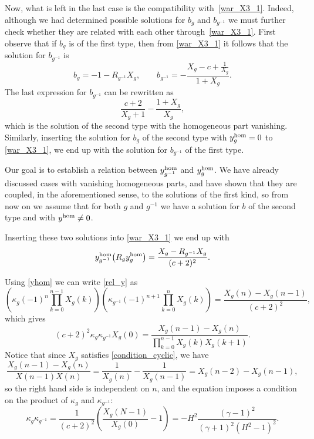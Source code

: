 \documentclass[10pt,a4paper]{amsart}
\numberwithin{equation}{section}
\begin{document}
Now, what is left in the last case is the compatibility with~\eqref{war_X3_1}. Indeed, although we had determined possible solutions for $b_g$ and
$b_{g^{-1}}$ we must further check whether they are related with each other through~\eqref{war_X3_1}. First observe that if $b_g$ is of the first type,
then from \eqref{war_X3_1} it follows that the solution for $b_{g^{-1}}$ is
\[ b_g=-1-R_{g^{-1}}X_g, \qquad b_{g^{-1}}=-\frac{X_g - c+\frac{1}{X_g}}{1+X_g}. \]
The last expression for $b_{g^{-1}}$ can be rewritten as
\[ \frac{c+2}{X_g+1}-\frac{1+X_g}{X_g}, \]
which is the solution of the second type with the homogeneous part vanishing. Similarly, inserting the solution for $b_g$ of the second type
with $y^{{\rm hom}}_g=0$ to \eqref{war_X3_1}, we end up with the solution for $b_{g^{-1}}$ of the first type.

Our goal is to establish a relation between $y^{{\rm hom}}_{g^{-1}}$ and $y^{{\rm hom}}_g$. We have already discussed cases with vanishing homogeneous parts,
and have shown that they are coupled, in the aforementioned sense, to the solutions of the first kind, so from now on we assume that for both $g$ and $g^{-1}$ we have
a solution for $b$ of the second type and with $y^{{\rm hom}}\neq 0$.

Inserting these two solutions into \eqref{war_X3_1} we end up with
\begin{equation}
y^{{\rm hom}}_{g^{-1}}\big(R_gy^{{\rm hom}}_g\big)=\frac{X_g-R_{g^{-1}}X_g}{(c+2)^2}. \label{rel_y}
\end{equation}

Using \eqref{yhom} we can write \eqref{rel_y} as
\begin{equation*}
\left(\kappa_g (-1)^n \prod_{k=0}^{n-1} X_g(k) \right)
\left( \kappa_{g^{-1}} (-1)^{n+1} \prod_{k=0}^{n} X_g(k) \right)
= \frac{X_g(n)-X_g(n-1)}{(c+2)^2},
\end{equation*}
which gives
\begin{equation*}
(c+2)^2\kappa_g\kappa_{g^{-1}}X_g(0)=\frac{X_g(n-1)-X_g(n)}{\prod\limits_{k=0}^{n-1}X_g(k)X_g(k+1)}.
\end{equation*}
Notice that since $X_g$ satisfies \eqref{condition_cyclic},
we have
\[
\frac{X_g(n-1)-X_g(n)}{X(n-1)X(n)} = \frac{1}{X_g(n)} - \frac{1}{X_g(n-1)}
= X_g(n-2) - X_g(n-1), \]
so the right hand side is independent on $n$, and the equation imposes a
condition on the product of $\kappa_g$ and $\kappa_{g^{-1}}$:
\begin{equation*}
\kappa_g\kappa_{g^{-1}}=\frac{1}{(c+2)^2}\left(\frac{X_g(N-1)}{X_g(0)}-1\right)
=- H^2 \frac{(\gamma-1)^2}{(\gamma+1)^2(H^2-1)^2}.
\end{equation*}
\end{document}
